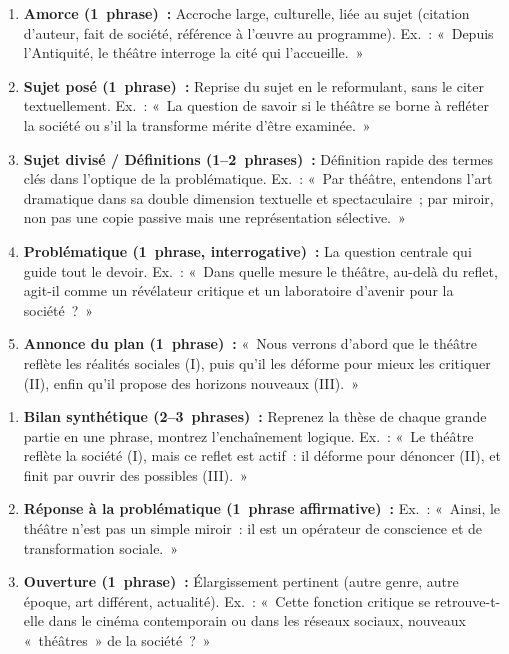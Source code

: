 \documentclass[11pt]{article}
\begin{document}
\begin{methode}
\begin{enumerate}
    \item \textbf{Amorce (1~phrase)~:} Accroche large, culturelle, liée au sujet (citation d'auteur, fait de société, référence à l'œuvre au programme). Ex.~: «~Depuis l'Antiquité, le théâtre interroge la cité qui l'accueille.~»
    \item \textbf{Sujet posé (1~phrase)~:} Reprise du sujet en le reformulant, sans le citer textuellement. Ex.~: «~La question de savoir si le théâtre se borne à refléter la société ou s'il la transforme mérite d'être examinée.~»
    \item \textbf{Sujet divisé / Définitions (1--2~phrases)~:} Définition rapide des termes clés dans l'optique de la problématique. Ex.~: «~Par théâtre, entendons l'art dramatique dans sa double dimension textuelle et spectaculaire~; par miroir, non pas une copie passive mais une représentation sélective.~»
    \item \textbf{Problématique (1~phrase, interrogative)~:} La question centrale qui guide tout le devoir. Ex.~: «~Dans quelle mesure le théâtre, au-delà du reflet, agit-il comme un révélateur critique et un laboratoire d'avenir pour la société~?~»
    \item \textbf{Annonce du plan (1~phrase)~:} «~Nous verrons d'abord que le théâtre reflète les réalités sociales (I), puis qu'il les déforme pour mieux les critiquer (II), enfin qu'il propose des horizons nouveaux (III).~»
\end{enumerate}
\end{methode}

\begin{methode}
\begin{enumerate}
    \item \textbf{Bilan synthétique (2--3~phrases)~:} Reprenez la thèse de chaque grande partie en une phrase, montrez l'enchaînement logique. Ex.~: «~Le théâtre reflète la société (I), mais ce reflet est actif~: il déforme pour dénoncer (II), et finit par ouvrir des possibles (III).~»
    \item \textbf{Réponse à la problématique (1~phrase affirmative)~:} Ex.~: «~Ainsi, le théâtre n'est pas un simple miroir~: il est un opérateur de conscience et de transformation sociale.~»
    \item \textbf{Ouverture (1~phrase)~:} Élargissement pertinent (autre genre, autre époque, art différent, actualité). Ex.~: «~Cette fonction critique se retrouve-t-elle dans le cinéma contemporain ou dans les réseaux sociaux, nouveaux «~théâtres~» de la société~?~»
\end{enumerate}
\end{methode}
\end{document}
